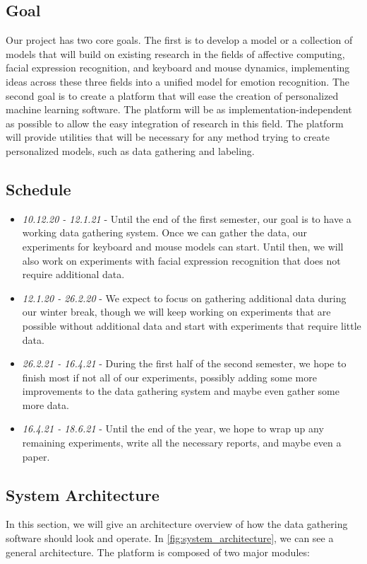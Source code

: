 \documentclass[../main.tex]{subfiles}
\begin{document}
\subsection{Goal}
Our project has two core goals. The first is to develop a model or a collection of models that will build on existing research in
the fields of affective computing, facial expression recognition, and keyboard and mouse dynamics, implementing ideas across these
three fields into a unified model for emotion recognition.
The second goal is to create a platform that will ease the creation of personalized machine learning software.
The platform will be as implementation-independent as possible to allow the easy integration of research in this field.
The platform will provide utilities that will be necessary for any method trying to create personalized models,
such as data gathering and labeling.


\subsection{Schedule}

 
\begin{itemize}
    \item \emph{10.12.20 - 12.1.21} - Until the end of the first semester, our goal is to have a working data gathering system.
        Once we can gather the data, our experiments for keyboard and mouse models can start. Until then,
        we will also work on experiments with facial expression recognition that does not require additional data. 
    \item \emph{12.1.20 - 26.2.20} - We expect to focus on gathering additional data during our winter break,
        though we will keep working on experiments that are possible without additional data and start with experiments that require
        little data.
    \item \emph{26.2.21 - 16.4.21} - During the first half of the second semester, we hope to finish most if not all of our experiments,
        possibly adding some more improvements to the data gathering system and maybe even gather some more data. 
    \item \emph{16.4.21 - 18.6.21} - Until the end of the year, we hope to wrap up any remaining experiments, write all the necessary reports,
        and maybe even a paper.
\end{itemize}
 

\subsection{System Architecture}
In this section, we will give an architecture overview of how the data gathering software should look and operate.
In \ref{fig:system_architecture}, we can see a general architecture. The platform is composed of two major modules:
\end{document}
